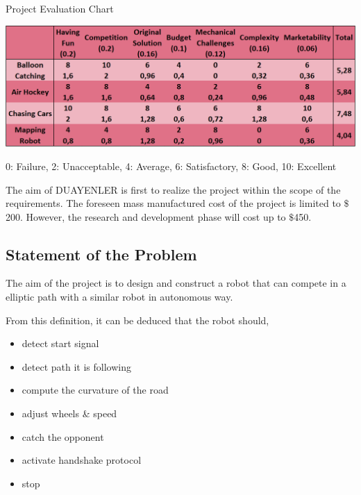 \documentclass[a4paper,12pt]{article}
\begin{document}
	\begin{table}[H]
		\centering
		\caption{\label{tab:project_eval}Project Evaluation Chart}\vspace{-.2cm}
		\includegraphics[width=\textwidth,height=\textheight,keepaspectratio]{images/project_evaluation4} 
	\vspace*{-.9cm}	\begin{center}
		{\small 0: Failure, 2: Unacceptable, 4: Average, 6: Satisfactory, 8: Good, 10: Excellent }	
		\end{center}
	\end{table}	\vspace*{-.5cm}	
	
	The aim of DUAYENLER is first to realize the project within the scope of the requirements. The foreseen mass manufactured cost of the project is limited to $\$$200. However, the research and development phase will cost up to 	$\$$450.
	
	\subsection{Statement of the Problem}
		
			The aim of the project is to design and construct a robot that can compete in a elliptic path with a similar robot in autonomous way.
			
			From this definition, it can be deduced that the robot should,
			\begin{itemize}
				\item detect start signal\vspace{-.2cm}
				\item detect path it is following\vspace{-.2cm}
				\item compute the curvature of the road\vspace{-.2cm}
				\item adjust wheels \& speed\vspace{-.2cm}
				\item catch the opponent\vspace{-.2cm}
				\item activate handshake protocol\vspace{-.2cm}
				\item stop\vspace{-.2cm}
			\end{itemize}
	
\end{document}
